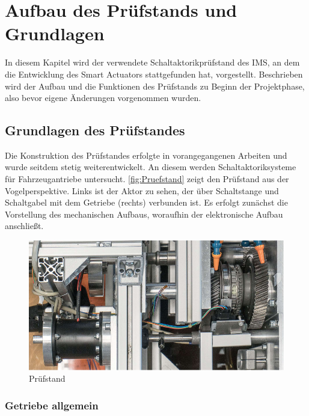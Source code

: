 \chapter{Aufbau des Prüfstands und Grundlagen}\label{kap2}
In diesem Kapitel wird der verwendete Schaltaktorikprüfstand des IMS, an dem  die Entwicklung des Smart Actuators stattgefunden hat, vorgestellt. Beschrieben wird der Aufbau und die Funktionen des Prüfstands zu Beginn der Projektphase, also bevor eigene Änderungen vorgenommen wurden.
\section{Grundlagen des Prüfstandes}
Die Konstruktion des Prüfstandes erfolgte in vorangegangenen Arbeiten und wurde seitdem stetig weiterentwickelt. An diesem werden Schaltaktoriksysteme für Fahrzeugantriebe untersucht. \autoref{fig:Pruefstand} zeigt den Prüfstand aus der Vogelperspektive. Links ist der Aktor zu sehen, der über Schaltstange und Schaltgabel mit dem Getriebe (rechts) verbunden ist.
Es erfolgt zunächst die Vorstellung des mechanischen Aufbaus, woraufhin der elektronische Aufbau anschließt. 
\begin{figure}[h]
	\centering
		\includegraphics{Bilder/Pruefstand.pdf}
	\caption{Prüfstand \cite[S.5]{adp}}
	\label{fig:Pruefstand}
\end{figure} \noindent
\subsection{Getriebe allgemein}

